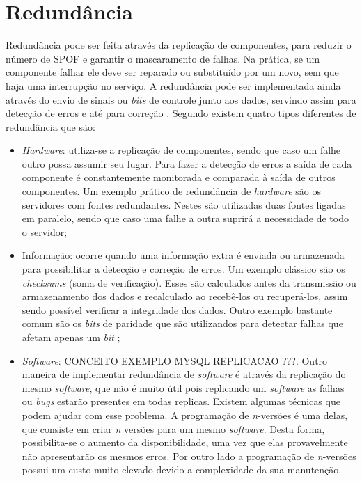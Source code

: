 \section{Redundância}
\label{section:redundancia}

Redundância pode ser feita através da replicação de componentes, para reduzir o número de \ac{SPOF} e garantir o mascaramento de falhas.
Na prática, se um componente falhar ele deve ser reparado ou substituído por um novo, sem que haja uma interrupção no serviço.
A redundância pode ser implementada ainda através do envio de sinais ou \textit{bits} de controle junto aos dados, servindo assim para 
detecção de erros e até para correção \cite{weber2002}. Segundo \cite{norvag2000} existem quatro tipos diferentes de redundância que são:
\begin{itemize}
 \item \textit{Hardware}: utiliza-se a replicação de componentes, sendo que caso um falhe outro possa assumir seu lugar. 
 Para fazer a detecção de erros a saída de cada componente é constantemente monitorada e comparada à saída de outros componentes.
 Um exemplo prático de redundância de \textit{hardware} são os servidores com fontes redundantes. Nestes são utilizadas duas fontes ligadas 
 em paralelo, sendo que caso uma falhe a outra suprirá a necessidade de todo o servidor;
 \item Informação: ocorre quando uma informação extra é enviada ou armazenada para possibilitar a detecção e correção de erros.
 Um exemplo clássico são os \textit{checksums} (soma de verificação). Esses são calculados antes da transmissão ou armazenamento dos dados 
 e recalculado ao recebê-los ou recuperá-los, assim sendo possível verificar a integridade dos dados. Outro exemplo bastante comum são os 
 \textit{bits} de paridade que são utilizandos para detectar falhas que afetam apenas um \textit{bit} \cite{weber2002};
 \item \textit{Software}: CONCEITO EXEMPLO MYSQL REPLICACAO ???. 
 Outro maneira de implementar redundância de \textit{software} é através da replicação do mesmo \textit{software}, que não é muito útil 
 pois replicando um \textit{software} as falhas ou \textit{bugs} estarão presentes em todas replicas. Existem algumas técnicas que podem 
 ajudar com esse problema. A programação de \textit{n}-versões é uma delas, que consiste em criar \textit{n} versões para um mesmo 
 \textit{software}. Desta forma, possibilita-se o aumento da disponibilidade, uma vez que elas provavelmente não apresentarão os mesmos 
 erros. Por outro lado a programação de \textit{n}-versões possui um custo muito elevado devido a complexidade da sua manutenção.

\end{itemize}
